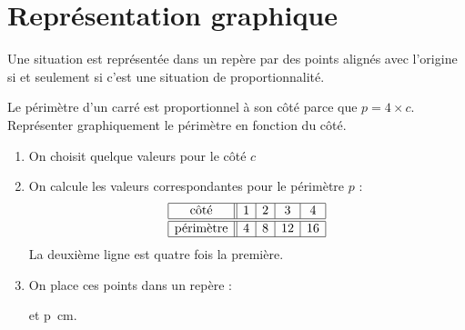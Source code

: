 


\section{Représentation graphique}

\begin{propriete}
    Une situation est représentée dans un repère par des points alignés avec l'origine si et seulement si c'est une situation de proportionnalité.
\end{propriete}

\begin{example}
    Le périmètre d'un carré est proportionnel à son côté parce que \( p=4\times c\). Représenter graphiquement le périmètre en fonction du côté.

    \begin{enumerate}
        \item
            On choisit quelque valeurs pour le côté \( c\)
        \item
            On calcule les valeurs correspondantes pour le périmètre \( p\) :
            \begin{equation*}
                \begin{array}[]{|c||c|c|c|c|}
                    \hline
                    \text{côté}&1&2&3&4\\
                    \hline\hline
                    \text{périmètre}&4&8&12&16\\
                    \hline
                \end{array}
            \end{equation*}
            La deuxième ligne est quatre fois la première.
        \item
            On place ces points dans un repère :
            \begin{center}

            \end{center}
            et \SI{p}{\centi\meter}.
    \end{enumerate}

\end{example}

